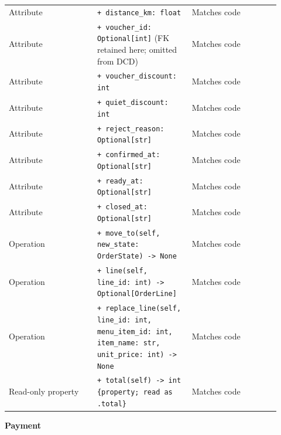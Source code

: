 \begin{longtable}{>{\raggedright\arraybackslash}p{0.3067\linewidth}>{\raggedright\arraybackslash}p{0.3067\linewidth}>{\raggedright\arraybackslash}p{0.3067\linewidth}}
Attribute & \texttt{+ distance\_\allowbreak{}km: float} & Matches code \\
Attribute & \texttt{+ voucher\_\allowbreak{}id: Optional[int]} (FK retained here; omitted from DCD) & Matches code \\
Attribute & \texttt{+ voucher\_\allowbreak{}discount: int} & Matches code \\
Attribute & \texttt{+ quiet\_\allowbreak{}discount: int} & Matches code \\
Attribute & \texttt{+ reject\_\allowbreak{}reason: Optional[str]} & Matches code \\
Attribute & \texttt{+ confirmed\_\allowbreak{}at: Optional[str]} & Matches code \\
Attribute & \texttt{+ ready\_\allowbreak{}at: Optional[str]} & Matches code \\
Attribute & \texttt{+ closed\_\allowbreak{}at: Optional[str]} & Matches code \\
Operation & \texttt{+ move\_\allowbreak{}to(self, new\_\allowbreak{}state: OrderState) -\textgreater{} None} & Matches code \\
Operation & \texttt{+ line(self, line\_\allowbreak{}id: int) -\textgreater{} Optional[OrderLine]} & Matches code \\
Operation & \texttt{+ replace\_\allowbreak{}line(self, line\_\allowbreak{}id: int, menu\_\allowbreak{}item\_\allowbreak{}id: int, item\_\allowbreak{}name: str, unit\_\allowbreak{}price: int) -\textgreater{} None} & Matches code \\
Read-only property & \texttt{+ total(self) -\textgreater{} int \{property; read as .\allowbreak{}total\}} & Matches code \\
\end{longtable}
\textbf{Payment}

